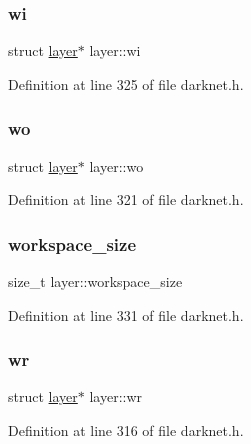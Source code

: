 \subsubsection{\texorpdfstring{wi}{wi}}
{\footnotesize\ttfamily struct \mbox{\hyperlink{structlayer}{layer}}$\ast$ layer\+::wi}



Definition at line 325 of file darknet.\+h.

\mbox{\label{structlayer_a9a4ba5c783fb440ee82552fe917254b6}} 
\subsubsection{\texorpdfstring{wo}{wo}}
{\footnotesize\ttfamily struct \mbox{\hyperlink{structlayer}{layer}}$\ast$ layer\+::wo}



Definition at line 321 of file darknet.\+h.

\mbox{\label{structlayer_afeb9d7fb2a202ef5387c135fbade83da}} 
\subsubsection{\texorpdfstring{workspace\_size}{workspace\_size}}
{\footnotesize\ttfamily size\+\_\+t layer\+::workspace\+\_\+size}



Definition at line 331 of file darknet.\+h.

\mbox{\label{structlayer_a9385c1d546abb2148bb8e05258d19bd4}} 
\subsubsection{\texorpdfstring{wr}{wr}}
{\footnotesize\ttfamily struct \mbox{\hyperlink{structlayer}{layer}}$\ast$ layer\+::wr}



Definition at line 316 of file darknet.\+h.

\mbox{\label{structlayer_af5ebb2f94c441e094e4ba3f04e318185}} 
